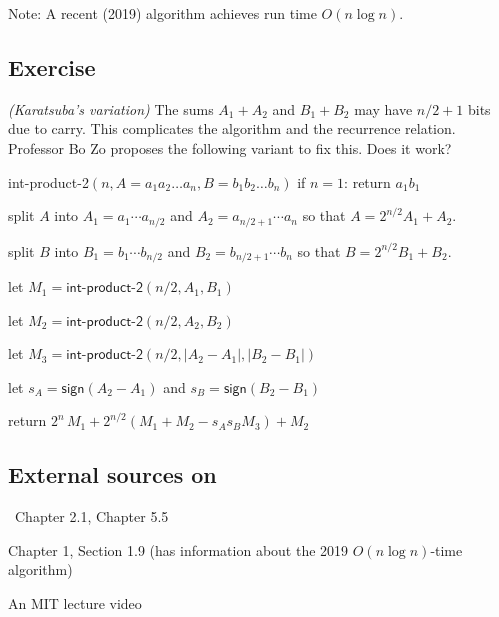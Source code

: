Note: A recent (2019) algorithm achieves run time $O(n\log n)$.


\subsection{Exercise}

\exercise\emph{(Karatsuba's variation)}
The sums $A_1+A_2$ and $B_1+B_2$ may have $n/2+1$ bits due to carry.
This complicates the algorithm and the recurrence relation.
Professor Bo Zo proposes the following variant to fix this.  Does it work?
\begin{myframed}
\begin{steps}
  \item[] {\sf int-product-2}$(n, A=a_1a_2\ldots a_n, B=b_1 b_2 \ldots b_n)$
    \step if $n = 1$: return $a_{1} b_{1}$

    \step split $A$ into $A_1 = a_1 \cdots a_{n/2}$ and $A_2 = a_{n/2+1} \cdots a_n$
    so that \(A = 2^{n/2} A_1 + A_2\).

    \step split $B$ into $B_1 = b_1 \cdots b_{n/2}$ and $B_2 = b_{n/2+1} \cdots b_n$
    so that \(B = 2^{n/2} B_1 + B_2\).

    \step let $M_{1} = \textsf{int-product-2}(n/2, A_1, B_1)$
    
    \step let $M_{2} = \textsf{int-product-2}(n/2, A_2, B_2)$

    \step let $M_{3} = \textsf{int-product-2}(n/2, |A_2 - A_1|, |B_2 - B_1|)$
    
    \step let $s_A = \textsf{sign}(A_2 - A_1)$ and $s_B = \textsf{sign}(B_2 - B_1)$

    \step return $2^{n}\, M_1 + 2^{n/2}(M_1 + M_2 - s_A s_B M_3) + M_2$
  \end{steps}
\end{myframed}



\subsection{External sources on }

\begin{mylist}[-]
\item \DPV~Chapter 2.1, \KT Chapter 5.5

\item
  \JE Chapter 1, Section 1.9 (has information about the 2019 $O(n\log n)$-time algorithm)
  
\item An MIT lecture video
  

\end{mylist}


